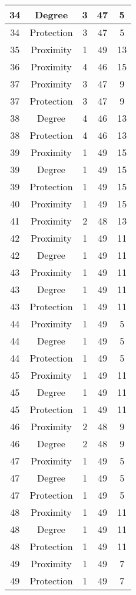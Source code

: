 \documentclass[results.tex]{subfiles}
\begin{document}
\begin{center}
\begin{tabular}{| c || c | c | c | c |}
    34 & Degree & 3 & 47 & 5 \\ 
    \hline
    34 & Protection & 3 & 47 & 5 \\ 
    \hline
    35 & Proximity & 1 & 49 & 13 \\ 
    \hline
    36 & Proximity & 4 & 46 & 15 \\ 
    \hline
    37 & Proximity & 3 & 47 & 9 \\ 
    \hline
    37 & Protection & 3 & 47 & 9 \\ 
    \hline
    38 & Degree & 4 & 46 & 13 \\ 
    \hline
    38 & Protection & 4 & 46 & 13 \\ 
    \hline
    39 & Proximity & 1 & 49 & 15 \\ 
    \hline
    39 & Degree & 1 & 49 & 15 \\ 
    \hline
    39 & Protection & 1 & 49 & 15 \\ 
    \hline
    40 & Proximity & 1 & 49 & 15 \\ 
    \hline
    41 & Proximity & 2 & 48 & 13 \\ 
    \hline
    42 & Proximity & 1 & 49 & 11 \\ 
    \hline
    42 & Degree & 1 & 49 & 11 \\ 
    \hline
    43 & Proximity & 1 & 49 & 11 \\ 
    \hline
    43 & Degree & 1 & 49 & 11 \\ 
    \hline
    43 & Protection & 1 & 49 & 11 \\ 
    \hline
    44 & Proximity & 1 & 49 & 5 \\ 
    \hline
    44 & Degree & 1 & 49 & 5 \\ 
    \hline
    44 & Protection & 1 & 49 & 5 \\ 
    \hline
    45 & Proximity & 1 & 49 & 11 \\ 
    \hline
    45 & Degree & 1 & 49 & 11 \\ 
    \hline
    45 & Protection & 1 & 49 & 11 \\ 
    \hline
    46 & Proximity & 2 & 48 & 9 \\ 
    \hline
    46 & Degree & 2 & 48 & 9 \\ 
    \hline
    47 & Proximity & 1 & 49 & 5 \\ 
    \hline
    47 & Degree & 1 & 49 & 5 \\ 
    \hline
    47 & Protection & 1 & 49 & 5 \\ 
    \hline
    48 & Proximity & 1 & 49 & 11 \\ 
    \hline
    48 & Degree & 1 & 49 & 11 \\ 
    \hline
    48 & Protection & 1 & 49 & 11 \\ 
    \hline
    49 & Proximity & 1 & 49 & 7 \\ 
    \hline
    49 & Protection & 1 & 49 & 7 \\ 
    \hline   \end{tabular}
\end{center}
\end{document}
